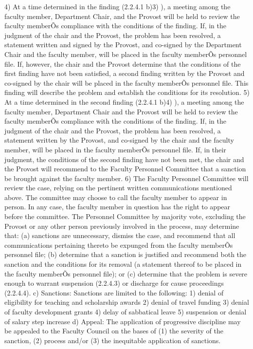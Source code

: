 \documentclass[letterpaper, 11pt]{article}
\begin{document}
				4) At a time determined in the finding (2.2.4.1 b)3) ), a meeting among the faculty member, Department Chair, and the Provost will be held to review the faculty memberÕs compliance with the conditions of the finding.  If, in the judgment of the chair and the Provost, the problem has been resolved, a statement written and signed by the Provost, and co-signed by the Department Chair and the faculty member, will be placed in the faculty memberÕs personnel file.  If, however, the chair and the Provost determine that the conditions of the first finding have not been satisfied, a second finding written by the Provost and co-signed by the chair will be placed in the faculty memberÕs personnel file.  This finding will describe the problem and establish the conditions for its resolution.
				5) At a time determined in the second finding (2.2.4.1 b)4) ), a meeting among the faculty member, Department Chair and the Provost will be held to review the faculty memberÕs compliance with the conditions of the finding.  If, in the judgment of the chair and the Provost, the problem has been resolved, a statement written by the Provost, and co-signed by the chair and the faculty member, will be placed in the faculty memberÕs personnel file.  If, in their judgment, the conditions of the second finding have not been met, the chair and the Provost will recommend to the Faculty Personnel Committee that a sanction be brought against the faculty member.
				6) The Faculty Personnel Committee will review the case, relying on the pertinent written communications mentioned above.  The committee may choose to call the faculty member to appear in person.  In any case, the faculty member in question has the right to appear before the committee.  The Personnel Committee by majority vote, excluding the Provost or any other person previously involved in the process, may determine that: (a) sanctions are unnecessary, dismiss the case, and recommend that all communications pertaining thereto be expunged from the faculty memberÕs personnel file; (b) determine that a sanction is justified and recommend both the sanction and the conditions for its removal (a statement thereof to be placed in the faculty memberÕs personnel file); or (c) determine that the problem is severe enough to warrant suspension (2.2.4.3) or discharge for cause proceedings (2.2.4.4).
				c) Sanctions:
				Sanctions are limited to the following:
				1) denial of eligibility for teaching and scholarship awards
				2) denial of travel funding
				3) denial of faculty development grants
				4) delay of sabbatical leave
				5) suspension or denial of salary step increase
				d) Appeal:
				The application of progressive discipline may be appealed to the Faculty Council on the bases of (1) the severity of the sanction, (2) process and/or (3) the inequitable application of sanctions.
\end{document}
